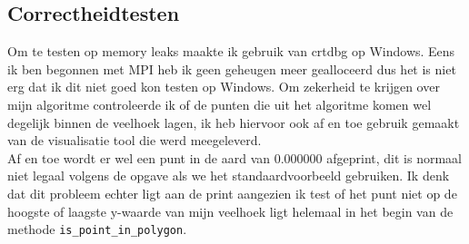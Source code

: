 \documentclass[a4paper]{article}
\begin{document}
\subsection{Correctheidtesten}
Om te testen op memory leaks maakte ik gebruik van crtdbg op Windows. Eens ik ben begonnen met MPI heb ik geen geheugen meer gealloceerd dus het is niet erg dat ik dit niet goed kon testen op Windows. Om zekerheid te krijgen over mijn algoritme controleerde ik of de punten die uit het algoritme komen wel degelijk binnen de veelhoek lagen, ik heb hiervoor ook af en toe gebruik gemaakt van de visualisatie tool die werd meegeleverd.\\ Af en toe wordt er wel een punt in de aard van 0.000000 afgeprint, dit is normaal niet legaal volgens de opgave als we het standaardvoorbeeld gebruiken. Ik denk dat dit probleem echter ligt aan de print aangezien ik test of het punt niet op de hoogste of laagste y-waarde van mijn veelhoek ligt helemaal in het begin van de methode \verb|is_point_in_polygon|.
\end{document}

